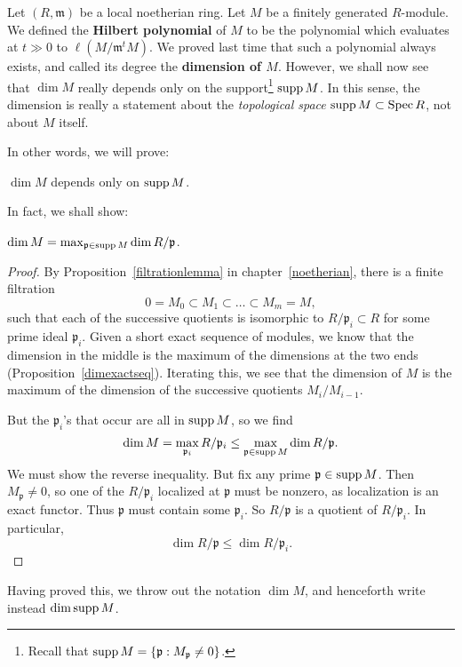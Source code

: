 Let $(R, \mathfrak{m})$ be a local noetherian ring. Let $M$ be a finitely generated
$R$-module. 	We defined the \textbf{Hilbert polynomial} of $M$ to be the
polynomial which evaluates at $t \gg 0$ to $\ell(M/\mathfrak{m}^tM)$. We proved
last time that such a polynomial always exists, and called its degree the
\textbf{dimension of $M$}. However, 
we shall now see that $\dim M$ really depends only on the support\footnote{
Recall that $\operatorname{supp} M = \left\{\mathfrak{p}: M_{\mathfrak{p}}\neq 0\right\}$.} $\operatorname{supp} M$.
In this sense, the dimension is really a statement about the \emph{topological
space} $\operatorname{supp} M \subset \operatorname{Spec} R$, not about $M$ itself. 


In other words, we will prove:
\begin{proposition} 
$\dim M$ depends only on $\operatorname{supp} M$.
\end{proposition} 

In fact, we shall show:

\begin{proposition} 
$\dim M = \max_{\mathfrak{p} \in \operatorname{supp} M} \dim R/\mathfrak{p}$.
\end{proposition} 
\begin{proof} 
By Proposition~\ref{filtrationlemma} in chapter~\ref{noetherian}, there is a finite filtration 
\[ 0 = M_0 \subset M_1 \subset \dots \subset M_m = M,  \]
such that each of the successive quotients is isomorphic to $R/\mathfrak{p}_i
\subset R$
for some prime ideal $\mathfrak{p}_i$. Given a short exact sequence
of modules, we know that the dimension in the middle is the maximum of the dimensions at the
two ends (Proposition~\ref{dimexactseq}). Iterating this, we see that the
dimension of $M$ is the maximum of the
dimension of the successive quotients $M_i/M_{i-1}$.

But the $\mathfrak{p}_i$'s that occur
are all in $\operatorname{supp} M$, so we find 
\[ \dim M = \max_{\mathfrak{p}_i} R/\mathfrak{p}_i \leq \max_{\mathfrak{p} \in \operatorname{supp} M} \dim R/\mathfrak{p}.  \]
We must show the reverse inequality. But fix any prime $\mathfrak{p} \in \operatorname{supp}
M$. Then $M_{\mathfrak{p}} \neq 0$, so one of the $R/\mathfrak{p}_i$ localized
at  $\mathfrak{p}$ must be nonzero, as localization is an exact functor. Thus
$\mathfrak{p}$ must contain some $\mathfrak{p}_i$. So $R/\mathfrak{p}$ is a
quotient of $R/\mathfrak{p}_i$. In particular,
\[ \dim R/\mathfrak{p} \leq \dim R/\mathfrak{p}_i.  \]
\end{proof} 

Having proved this, we throw out the notation $\dim M$, and henceforth write
instead $\dim \operatorname{supp} M$.



